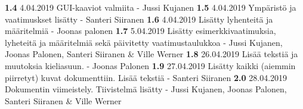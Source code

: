 \textbf{1.4} 4.04.2019 GUI-kaaviot valmiita - Jussi Kujanen\newline 
\textbf{1.5} 4.04.2019 Ympäristö ja vaatimuskset lisätty - Santeri Siiranen\newline 
\textbf{1.6} 4.04.2019 Lisätty lyhenteitä ja määritelmiä - Joonas palonen\newline 
\textbf{1.7} 5.04.2019 Lisätty esimerkkivaatimuksia, lyheteitä ja määritelmiä sekä päivitetty vaatimustaulukkoa - Jussi Kujanen, Joonas Palonen, Santeri Siiranen \& Ville Werner \newline 
\textbf{1.8} 26.04.2019 Lisää tekstiä ja muutoksia kieliasuun. - Joonas Palonen \newline 
\textbf{1.9} 27.04.2019 Lisätty kaikki (aiemmin piirretyt) kuvat dokumenttiin. Lisää tekstiä - Santeri Siiranen \newline 
\textbf{2.0} 28.04.2019 Dokumentin viimeistely. Tiivistelmä lisätty - Jussi Kujanen, Joonas Palonen, Santeri Siiranen \& Ville Werner \newline 

